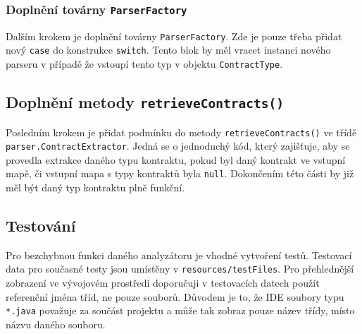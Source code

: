 	    	\subsubsection{Doplnění továrny \texttt{ParserFactory}} 
	    		Dalším krokem je doplnění továrny \texttt{ParserFactory}. Zde je pouze třeba přidat nový \texttt{case} do konstrukce \texttt{switch}. Tento blok by měl vracet instanci nového parseru v případě že vstoupí tento typ v objektu \texttt{ContractType}.
	    		
	    	\subsection{Doplnění metody \texttt{retrieveContracts()}}
	    		Posledním krokem je přidat podmínku do metody \texttt{retrieveContracts()} ve třídě \texttt{parser.ContractExtractor}. Jedná se o jednoduchý kód, který zajišťuje, aby se provedla extrakce daného typu kontraktu, pokud byl daný kontrakt ve vstupní mapě, či vstupní mapa s typy kontraktů byla \texttt{null}. Dokončením této části by již měl být daný typ kontraktu plně funkční.
	    		
	    	\subsection{Testování}
	    		Pro bezchybnou funkci daného analyzátoru je vhodné vytvoření testů. Testovací data pro současné testy jsou umístěny v \texttt{resources/testFiles}. Pro přehlednější zobrazení ve vývojovém prostředí doporučuji v testovacích datech použít referenční jména tříd, ne pouze souborů. Důvodem je to, že IDE soubory typu \texttt{*.java} považuje za součást projektu a může tak zobraz pouze název třídy, místo názvu daného souboru.

    
    
    
    
